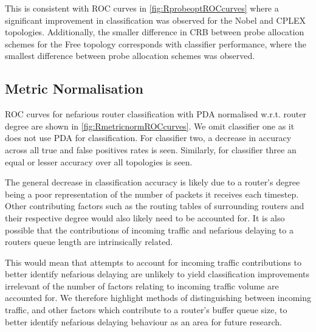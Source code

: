 This is consistent with ROC curves in \cref{fig:RprobeoptROCcurves} where a significant improvement in classification was observed for the Nobel and CPLEX topologies. Additionally, the smaller difference in CRB between probe allocation schemes for the Free topology corresponds with classifier performance, where the smallest difference between probe allocation schemes was observed.\par


\subsection{Metric Normalisation}
\label{ssec:Rmetricnormilisation}
ROC curves for nefarious router classification with PDA normalised w.r.t. router degree are shown in \cref{fig:RmetricnormROCcurves}. We omit classifier one as it does not use PDA for classification. For classifier two, a decrease in accuracy across all true and false positives rates is seen. Similarly, for classifier three an equal or lesser accuracy over all topologies is seen.\par
The general decrease in classification accuracy is likely due to a router's degree being a poor representation of the number of packets it receives each timestep. Other contributing factors such as the routing tables of surrounding routers and their respective degree would also likely need to be accounted for. It is also possible that the contributions of incoming traffic and nefarious delaying to a routers queue length are intrinsically related.\par
This would mean that attempts to account for incoming traffic contributions to better identify nefarious delaying are unlikely to yield classification improvements irrelevant of the number of factors relating to incoming traffic volume are accounted for. We therefore highlight methods of distinguishing between incoming traffic, and other factors which contribute to a router's buffer queue size, to better identify nefarious delaying behaviour as an area for future research.\par
\noindent

